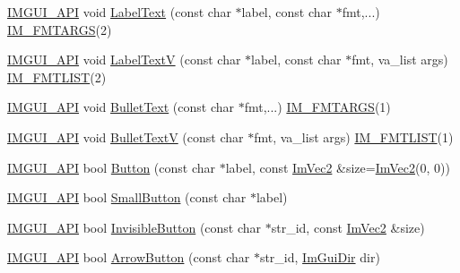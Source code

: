 \begin{DoxyCompactItemize}
\item 
\mbox{\hyperlink{imgui_8h_a43829975e84e45d1149597467a14bbf5}{I\+M\+G\+U\+I\+\_\+\+A\+PI}} void \mbox{\hyperlink{namespace_im_gui_ad92ccfbc33d448ff40cfcf9219177344}{Label\+Text}} (const char $\ast$label, const char $\ast$fmt,...) \mbox{\hyperlink{imgui_8h_a1251c2f9ddac0873dbad8181bd82c9f1}{I\+M\+\_\+\+F\+M\+T\+A\+R\+GS}}(2)
\item 
\mbox{\hyperlink{imgui_8h_a43829975e84e45d1149597467a14bbf5}{I\+M\+G\+U\+I\+\_\+\+A\+PI}} void \mbox{\hyperlink{namespace_im_gui_a55e5a7edb676a8f5cd7f65443138a8a0}{Label\+TextV}} (const char $\ast$label, const char $\ast$fmt, va\+\_\+list args) \mbox{\hyperlink{imgui_8h_a047693beb7f899f5deab1e20202016b3}{I\+M\+\_\+\+F\+M\+T\+L\+I\+ST}}(2)
\item 
\mbox{\hyperlink{imgui_8h_a43829975e84e45d1149597467a14bbf5}{I\+M\+G\+U\+I\+\_\+\+A\+PI}} void \mbox{\hyperlink{namespace_im_gui_af8d34d563b17c683943a0fa7bf5807bc}{Bullet\+Text}} (const char $\ast$fmt,...) \mbox{\hyperlink{imgui_8h_a1251c2f9ddac0873dbad8181bd82c9f1}{I\+M\+\_\+\+F\+M\+T\+A\+R\+GS}}(1)
\item 
\mbox{\hyperlink{imgui_8h_a43829975e84e45d1149597467a14bbf5}{I\+M\+G\+U\+I\+\_\+\+A\+PI}} void \mbox{\hyperlink{namespace_im_gui_af8f4b5e96c745e205974857f9a584583}{Bullet\+TextV}} (const char $\ast$fmt, va\+\_\+list args) \mbox{\hyperlink{imgui_8h_a047693beb7f899f5deab1e20202016b3}{I\+M\+\_\+\+F\+M\+T\+L\+I\+ST}}(1)
\item 
\mbox{\hyperlink{imgui_8h_a43829975e84e45d1149597467a14bbf5}{I\+M\+G\+U\+I\+\_\+\+A\+PI}} bool \mbox{\hyperlink{namespace_im_gui_a38094c568ce398db5a3abb9d3ac92030}{Button}} (const char $\ast$label, const \mbox{\hyperlink{struct_im_vec2}{Im\+Vec2}} \&size=\mbox{\hyperlink{struct_im_vec2}{Im\+Vec2}}(0, 0))
\item 
\mbox{\hyperlink{imgui_8h_a43829975e84e45d1149597467a14bbf5}{I\+M\+G\+U\+I\+\_\+\+A\+PI}} bool \mbox{\hyperlink{namespace_im_gui_a5b76ec69758aeb0a00a66f142f7a4fb2}{Small\+Button}} (const char $\ast$label)
\item 
\mbox{\hyperlink{imgui_8h_a43829975e84e45d1149597467a14bbf5}{I\+M\+G\+U\+I\+\_\+\+A\+PI}} bool \mbox{\hyperlink{namespace_im_gui_a22668d440cbbb1f8be07241d9c6d9096}{Invisible\+Button}} (const char $\ast$str\+\_\+id, const \mbox{\hyperlink{struct_im_vec2}{Im\+Vec2}} \&size)
\item 
\mbox{\hyperlink{imgui_8h_a43829975e84e45d1149597467a14bbf5}{I\+M\+G\+U\+I\+\_\+\+A\+PI}} bool \mbox{\hyperlink{namespace_im_gui_ad2bc397a02d5e4b8a14360d89abc6242}{Arrow\+Button}} (const char $\ast$str\+\_\+id, \mbox{\hyperlink{imgui_8h_a874086389bc27cc9647118d22a806403}{Im\+Gui\+Dir}} dir)

\end{DoxyCompactItemize}
